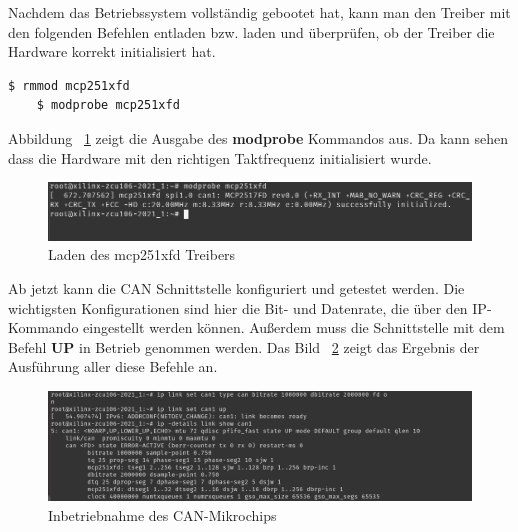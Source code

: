 Nachdem das Betriebssystem vollständig gebootet hat, kann man den Treiber mit den folgenden Befehlen entladen bzw. laden und überprüfen, ob der Treiber die Hardware korrekt initialisiert hat.  
\begin{lstlisting}[language=bash]
	$ rmmod mcp251xfd
	$ modprobe mcp251xfd
\end{lstlisting}
Abbildung ~\ref{fig:treiber:ladung} zeigt die Ausgabe des \textbf{modprobe} Kommandos aus. Da kann sehen dass die Hardware mit den richtigen Taktfrequenz initialisiert wurde. 
\begin{figure}[H]
	\begin{center}		\includegraphics[width=1\textwidth]{./images/mcp_treiber_initialisietung.jpg}
	\end{center}
	\vspace{-5pt}
	\caption[Laden des mcp251xfd Treibers]{Laden des mcp251xfd Treibers} %
	\label{fig:treiber:ladung}
	\vspace{-5pt}
\end{figure}

Ab jetzt kann die CAN Schnittstelle konfiguriert und getestet werden. Die wichtigsten Konfigurationen sind hier die Bit- und Datenrate, die über den IP-Kommando eingestellt werden können. Außerdem muss die Schnittstelle mit dem Befehl \textbf{UP} in Betrieb genommen werden. Das Bild ~\ref{fig:can:inbetriebnahme} zeigt das Ergebnis der Ausführung aller diese Befehle an. 

\begin{figure}[H]
	\begin{center}		\includegraphics[width=1\textwidth]{./images/can_bitrate.jpg}
	\end{center}
	\vspace{-5pt}
	\caption[Inbetriebnahme des CAN-Mikrochips]{Inbetriebnahme des CAN-Mikrochips} %
	\label{fig:can:inbetriebnahme}
	\vspace{-5pt}
\end{figure}

